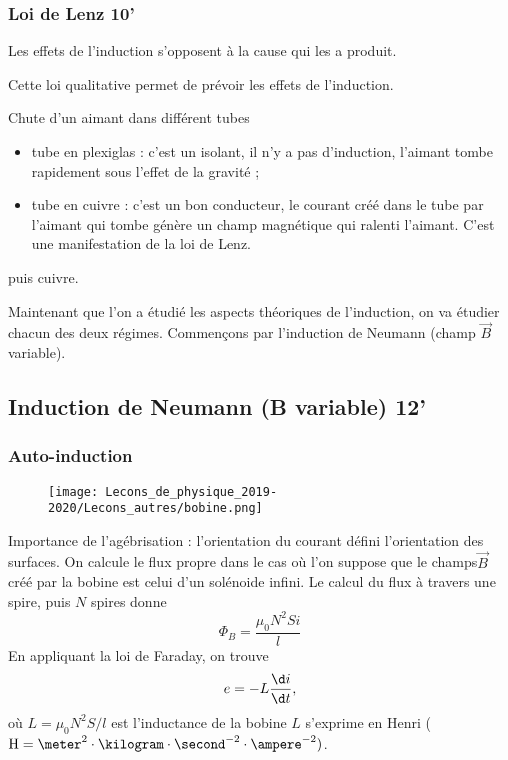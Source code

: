 \subsubsection{Loi de Lenz 10'}

Les effets de l'induction s'opposent à la cause qui les a produit.

Cette loi qualitative permet de prévoir les effets de l'induction.

\begin{experience}
Chute d'un aimant dans différent tubes
\begin{itemize}
\item tube en plexiglas : c'est un isolant, il n'y a pas d'induction, l'aimant tombe rapidement sous l'effet de la gravité ;
\item tube en cuivre : c'est un bon conducteur, le courant créé dans le tube par l'aimant qui tombe génère un champ magnétique qui ralenti l'aimant.
C'est une manifestation de la loi de Lenz.
\end{itemize}  puis cuivre.
\end{experience}

\begin{transition}
Maintenant que l'on a étudié les aspects théoriques de l'induction, on va étudier chacun des deux régimes.
Commençons par l'induction de Neumann (champ $\overrightarrow{B}$ variable).
\end{transition}

\subsection{Induction de Neumann (B variable) 12'}

\subsubsection{Auto-induction}

\begin{figure}[!h]
\center
\texttt{[image: Lecons\_de\_physique\_2019-2020/Lecons\_autres/bobine.png]}
\end{figure}

Importance de l'agébrisation : l'orientation du courant défini l'orientation des surfaces.
On calcule le flux propre dans le cas où l'on suppose que le champs$\overrightarrow{B}$ créé par la bobine est celui d'un solénoide infini.
Le calcul du flux à travers une spire, puis $N$ spires donne
\begin{equation}
\Phi_B = \frac{\mu_0 N^2 S i}{l}
\end{equation}
En appliquant la loi de Faraday, on trouve
\begin{equation}
e = -L\frac{\d i}{\d t},
\end{equation}
où $L = \mu_0 N^2 S/l$ est l'inductance de la bobine  
$L$ s'exprime en Henri ($\mathrm{H}=\meter^2\cdot\kilogram\cdot\second^{-2}\cdot\ampere^{-2})$.

